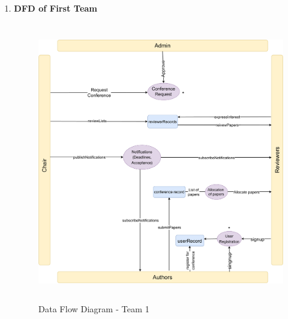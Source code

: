 \documentclass[english,a4paper,12pt]{report}
\begin{document}
\begin{enumerate}
    \item \textbf{DFD of First Team}
    \begin{figure}[h!]
\centering
 \includegraphics[keepaspectratio,width=25cm,height=12cm]{SRA-Images/DFD-Team1.pdf}
 \caption{Data Flow Diagram - Team 1}
\end{figure}


\end{enumerate}
\end{document}

